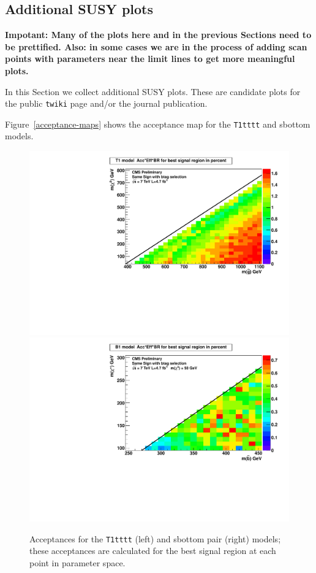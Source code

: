 


\subsection{Additional SUSY plots}
\label{sec:moreSUSYplos}

{\bf Impotant: Many of the plots here and in the previous Sections
need to be prettified.  Also: in some cases we are in the
process of adding scan points with parameters near the limit 
lines to get more meaningful plots.}


In this Section we collect additional SUSY plots.  These are 
candidate plots for the public {\tt twiki} page and/or the 
journal publication.

Figure~\ref{acceptance-maps} shows the acceptance map
for the {\tt T1tttt} and sbottom models.

\begin{figure}[htb]
\begin{center}
\includegraphics[width=0.49\linewidth]{figs/T1tttt_AcceptanceCarpet.pdf}
\includegraphics[width=0.49\linewidth]{figs/B1_AcceptanceCarpet.pdf}
\caption{Acceptances for the {\tt T1tttt} (left) and 
sbottom pair (right) models; these acceptances
are calculated for the best signal region at each point
in parameter space.
\label{fig:acceptance-maps}}
\end{center}
\end{figure}


